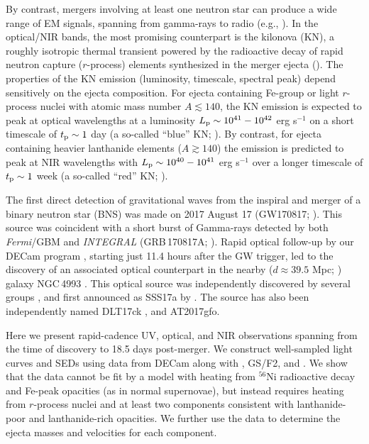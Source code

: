 By contrast, mergers involving at least one neutron star can produce a wide range of EM signals, spanning from gamma-rays to radio (e.g., \citealt{MetzgerBerger12}). In the optical/NIR bands, the most promising counterpart is the kilonova (KN), a roughly isotropic thermal transient powered by the radioactive decay of rapid neutron capture ($r$-process) elements synthesized in the merger ejecta (\citealt{LP98,Metzger+10,Roberts+11,MetzgerBerger12,BarnesKasen13,Tanaka+14}).
The properties of the KN emission (luminosity, timescale, spectral peak) depend sensitively on the ejecta composition.  For ejecta containing Fe-group or light $r$-process nuclei with atomic mass number $A\lesssim 140$, the KN emission is expected to peak at optical wavelengths at a luminosity $L_{\rm p}\sim 10^{41}-10^{42}$ erg s$^{-1}$ on a short timescale of $t_{\rm p}\sim 1$ day (a so-called ``blue'' KN; \citealt{Metzger+10,Roberts+11,MetzgerFernandez2014}).  By contrast, for ejecta containing heavier lanthanide elements ($A\gtrsim 140$) the emission is predicted to peak at NIR wavelengths with $L_{\rm p} \sim 10^{40}-10^{41}$ erg s$^{-1}$ over a longer timescale of $t_{\rm p}\sim 1$ week (a so-called ``red'' KN; \citealt{BarnesKasen13,Kasen+13,Tanaka+14}).

The first direct detection of gravitational waves from the inspiral and merger of a binary neutron star (BNS) was made on 2017 August 17 (GW170817; \citealt{LIGOGW170817}). This source was coincident with a short burst of Gamma-rays detected by both {\it Fermi}/GBM and {\it INTEGRAL} (GRB\,170817A; \citealt{GW170817Fermi,Savchenko+17}). Rapid optical follow-up by our DECam program \citep{Flaugher+15}, starting just 11.4 hours after the GW trigger, led to the discovery of an associated optical counterpart in the nearby ($d\approx 39.5$ Mpc; \citealt{Freedman+01}) galaxy NGC\,4993 \citep{GW170817DECam}. This optical source was independently discovered by several groups \citep{LIGOMMAPaper}, and first announced as SSS17a by \cite{Coulter+17}. The source has also been independently named DLT17ck \citep{Valenti+17}, and AT2017gfo.

Here we present rapid-cadence UV, optical, and NIR observations spanning from the time of discovery to 18.5 days post-merger.  We construct well-sampled light curves and SEDs using data from DECam along with \swift, GS/F2, and \HST. We show that the data cannot be fit by a model with heating from $^{56}$Ni radioactive decay and Fe-peak opacities (as in normal supernovae), but instead requires heating from $r$-process nuclei and at least two components consistent with lanthanide-poor and lanthanide-rich opacities. We further use the data to determine the ejecta masses and velocities for each component.

